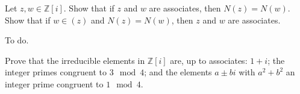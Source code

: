 \documentclass[../../master.tex]{subfiles}
\begin{document}
\begin{problem}
    Let $z, w \in \mathbb{Z}[i]$.
    Show that if $z$ and $w$ are associates, then $N(z) = N(w)$.
    Show that if $w \in (z)$ and $N(z) = N(w)$, then $z$ and $w$ are associates.
\end{problem}

\begin{solution}
    To do.
\end{solution}

\begin{problem}
    Prove that the irreducible elements in $\mathbb{Z}[i]$ are, up to associates:
    $1 + i$;
    the integer primes congruent to $3 \mod 4$;
    and the elements $a \pm bi$ with $a^2 + b^2$ an integer prime congruent to $1 \mod 4$.
\end{problem}
\end{document}
